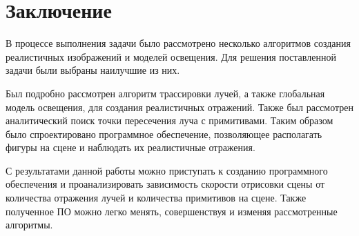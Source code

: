 \chapter*{Заключение}
В процессе выполнения задачи было рассмотрено несколько алгоритмов создания реалистичных изображений и моделей освещения. Для решения поставленной
задачи были выбраны наилучшие из них.

Был подробно рассмотрен алгоритм трассировки лучей, а также глобальная модель освещения, для создания реалистичных отражений. Также был рассмотрен
аналитический поиск точки пересечения луча с примитивами. Таким образом было спроектировано программное  обеспечение, позволяющее располагать фигуры на сцене и
наблюдать их  реалистичные отражения.

С результатами данной работы можно приступать к созданию программного обеспечения и проанализировать зависимость скорости отрисовки сцены от 
количества отражения лучей и количества примитивов на сцене. Также полученное ПО можно легко менять, совершенствуя и изменяя рассмотренные алгоритмы.